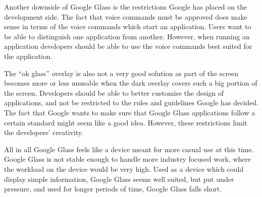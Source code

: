 Another downside of Google Glass is the restrictions Google has placed on the development side. The fact that voice commands must be approved does make sense in terms of the voice commands which start an application. Users want to be able to distinguish one application from another. However, when running an application developers should be able to use the voice commands best suited for the application.

The ``ok glass'' overlay is also not a very good solution as part of the screen becomes more or less unusable when the dark overlay covers such a big portion of the screen. Developers should be able to better customise the design of applications, and not be restricted to the rules and guidelines Google has decided. The fact that Google wants to make sure that Google Glass applications follow a certain standard might seem like a good idea. However, these restrictions limit the developers' creativity.

All in all Google Glass feels like a device meant for more casual use at this time. Google Glass is not stable enough to handle more industry focused work, where the workload on the device would be very high. Used as a device which could display simple information, Google Glass seems well suited, but put under pressure, and used for longer periods of time, Google Glass falls short.





